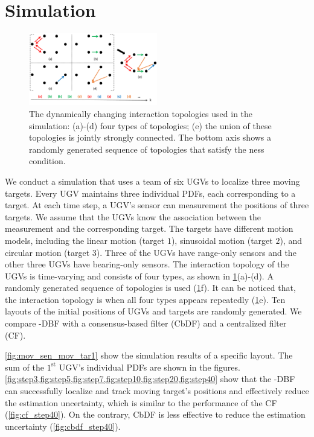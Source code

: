 \section{Simulation}\label{sec:sim}

	\begin{figure}		
		\includegraphics[width=0.5\textwidth]{figures/switch_topo}
		\caption{The dynamically changing interaction topologies used in the simulation: (a)-(d) four types of topologies; (e) the union of these topologies is jointly strongly connected. The bottom axis shows a randomly generated sequence of topologies that satisfy the \fc ness condition.}\label{fig:com_topo}		
	\end{figure}		
			
	We conduct a simulation that uses a team of six UGVs to localize three moving targets.
	Every UGV maintains three individual PDFs, each corresponding to a target.
	At each time step, a UGV's sensor can measurement the positions of three targets.
	We assume that the UGVs know the association between the measurement and the corresponding target.
	The targets have different motion models, including the linear motion (target $1$), sinusoidal motion (target $2$), and circular motion (target $3$).
	Three of the UGVs have range-only sensors and the other three UGVs have bearing-only sensors.
	The interaction topology of the UGVs is time-varying and consists of four types, as shown in \cref{fig:com_topo}(a)-(d).
	A randomly generated sequence of topologies is used (\cref{fig:com_topo}f).
	It can be noticed that, the interaction topology is \fc when all four types appears repeatedly (\cref{fig:com_topo}e).
	Ten layouts of the initial positions of UGVs and targets are randomly generated.
	We compare \proto-DBF with a consensus-based filter (CbDF) and a centralized filter (CF).
	
	\cref{fig:mov_sen_mov_tar1} show the simulation results of a specific layout.
	The sum of the $1^\text{st}$ UGV's individual PDFs are shown in the figures.
	\cref{fig:step3,fig:step5,fig:step7,fig:step10,fig:step20,fig:step40} show that the \proto-DBF can successfully localize and track moving target's positions and effectively reduce the estimation uncertainty, which is similar to the performance of the CF (\cref{fig:cf_step40}).
	On the contrary, CbDF is less effective to reduce the estimation uncertainty (\cref{fig:cbdf_step40}).
	

